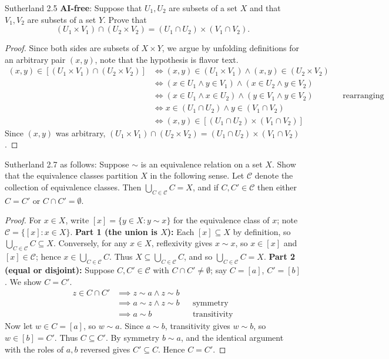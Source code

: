 \documentclass{homework}
\begin{document}
\begin{problems}
\problem Sutherland 2.5 \textbf{AI-free}:
Suppose that $U_1, U_2$ are subsets of a set $X$ and that $V_1, V_2$ are
subsets of a set $Y$. Prove that
\[
(U_1 \times V_1) \cap (U_2 \times V_2) = (U_1 \cap U_2) \times (V_1 \cap V_2).
\]
\solution
  \begin{proof}
$ $\newline Since both sides are subsets of $X \times Y$, we argue by unfolding definitions for an arbitrary pair $(x,y)$, note that the hypothesis is flavor text.
    \begin{align*}
      (x,y) \in [(U_1 \times V_1) \cap (U_2 \times V_2)]
      &\iff (x,y) \in (U_1 \times V_1) \land (x,y) \in (U_2 \times V_2) \\
      &\iff (x \in U_1 \land y \in V_1) \land (x \in U_2 \land y \in V_2) \\
      &\iff (x \in U_1 \land x \in U_2) \land (y \in V_1 \land y \in V_2) && \text{rearranging conjuncts}\\
      &\iff x \in (U_1 \cap U_2) \land y \in (V_1 \cap V_2) \\
      &\iff (x,y) \in [(U_1 \cap U_2) \times (V_1 \cap V_2)]
    \end{align*}
    Since $(x,y)$ was arbitrary, $(U_1 \times V_1) \cap (U_2 \times V_2) = (U_1 \cap U_2) \times (V_1 \cap V_2)$.
\end{proof}

\problem Sutherland 2.7 as follows:
Suppose $\sim$ is an equivalence relation on a set $X$. Show that the equivalence classes partition
$X$ in the following sense. Let $\mathcal{C}$ denote the collection of equivalence classes. Then
$\bigcup_{C \in \mathcal{C}} C = X$, and if $C, C' \in \mathcal{C}$ then either $C = C'$ or
$C \cap C' = \emptyset$.
\solution
  \begin{proof}
$ $\newline For $x \in X$, write $[x] = \{y \in X : y \sim x\}$ for the equivalence class of $x$; note $\mathcal{C} = \{[x] : x \in X\}$. \newline
    \textbf{Part 1 (the union is $X$):}
    Each $[x] \subseteq X$ by definition, so $\bigcup_{C \in \mathcal{C}} C \subseteq X$. Conversely, for any $x \in X$, reflexivity gives $x \sim x$, so $x \in [x]$ and $[x] \in \mathcal{C}$; hence $x \in \bigcup_{C \in \mathcal{C}} C$. Thus $X \subseteq \bigcup_{C \in \mathcal{C}} C$, and so $\bigcup_{C \in \mathcal{C}} C = X$. \newline
    \textbf{Part 2 (equal or disjoint):} Suppose $C, C' \in \mathcal{C}$ with $C \cap C' \neq \emptyset$; say $C = [a]$, $C' = [b]$. We show $C = C'$.
    \begin{align*}
      z \in C \cap C' &\implies z \sim a \land z \sim b \\
      &\implies a \sim z \land z \sim b && \text{symmetry}\\
      &\implies a \sim b && \text{transitivity}
    \end{align*}
    Now let $w \in C = [a]$, so $w \sim a$. Since $a \sim b$, transitivity gives $w \sim b$, so $w \in [b] = C'$. Thus $C \subseteq C'$. By symmetry $b \sim a$, and the identical argument with the roles of $a,b$ reversed gives $C' \subseteq C$. Hence $C = C'$.


\end{proof}
\end{problems}
\end{document}
